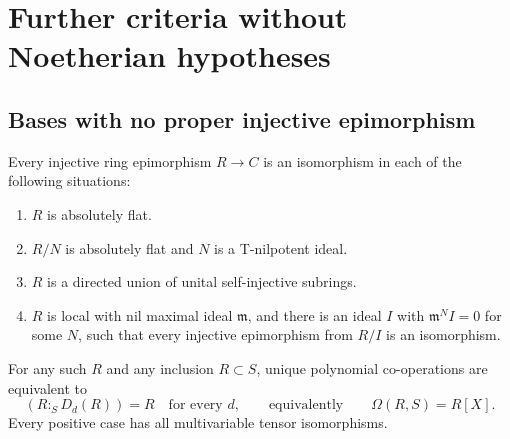 \section{Further criteria without Noetherian hypotheses}

\subsection{Bases with no proper injective epimorphism}

\begin{proposition}\label{prop:epimorphism-rigid-bases}
Every injective ring epimorphism $R\to C$ is an isomorphism in each
of the following situations:
\begin{enumerate}
\item $R$ is absolutely flat.
\item $R/N$ is absolutely flat and $N$ is a T-nilpotent ideal.
\item $R$ is a directed union of unital self-injective subrings.
\item $R$ is local with nil maximal ideal $\mathfrak m$, and there is
an ideal $I$ with $\mathfrak m^NI=0$ for some $N$, such that every
injective epimorphism from $R/I$ is an isomorphism.
\end{enumerate}
For any such $R$ and any inclusion $R\subset S$, unique polynomial
co-operations are equivalent to
\[
              (R:_S D_d(R))=R\quad\text{for every }d,
 \qquad\text{equivalently}\qquad\Omega(R,S)=R[X].
\]
Every positive case has all multivariable tensor isomorphisms.
\end{proposition}
